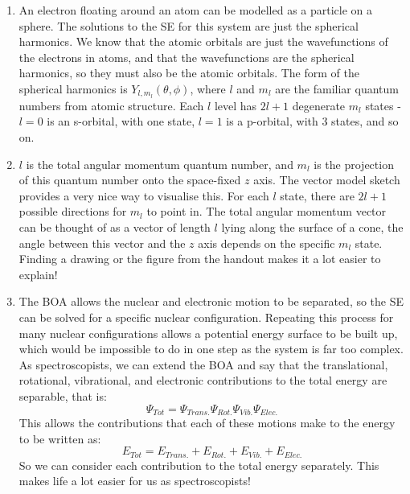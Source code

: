 \documentclass{memoir}[11pt,oneside,a4paper,openany]
\begin{document}
\begin{enumerate}
	\item An electron floating around an atom can be modelled as a particle on a sphere. The solutions to the SE for this system are just the spherical harmonics. We know that the atomic orbitals are just the wavefunctions of the electrons in atoms, and that the wavefunctions are the spherical harmonics, so they must also be the atomic orbitals. The form of the spherical harmonics is $Y_{l,m_l}(\theta,\phi)$, where $l$ and $m_l$ are the familiar quantum numbers from atomic structure. Each $l$ level has $2l+1$ degenerate $m_l$ states - $l=0$ is an s-orbital, with one state, $l=1$ is a p-orbital, with 3 states, and so on. 
	\item $l$ is the total angular momentum quantum number, and $m_l$ is the projection of this quantum number onto the space-fixed $z$ axis. The vector model sketch provides a very nice way to visualise this. For each $l$ state, there are $2l+1$ possible directions for $m_l$ to point in. The total angular momentum vector can be thought of as a vector of length $l$ lying along the surface of a cone, the angle between this vector and the $z$ axis depends on the specific $m_l$ state. Finding a drawing or the figure from the handout makes it a lot easier to explain!
	\item The BOA allows the nuclear and electronic motion to be separated, so the SE can be solved for a specific nuclear configuration. Repeating this process for many nuclear configurations allows a potential energy surface to be built up, which would be impossible to do in one step as the system is far too complex. As spectroscopists, we can extend the BOA and say that the translational, rotational, vibrational, and electronic contributions to the total energy are separable, that is:
		\begin{equation}
			\Psi_{Tot} = \Psi_{Trans.}\Psi_{Rot.}\Psi_{Vib.}\Psi_{Elec.}
		\end{equation}
		This allows the contributions that each of these motions make to the energy to be written as:
		\begin{equation}
			E_{Tot} = E_{Trans.} + E_{Rot.} + E_{Vib.} + E_{Elec.}
		\end{equation}
		So we can consider each contribution to the total energy separately. This makes life a lot easier for us as spectroscopists!

\end{enumerate}
\end{document}
